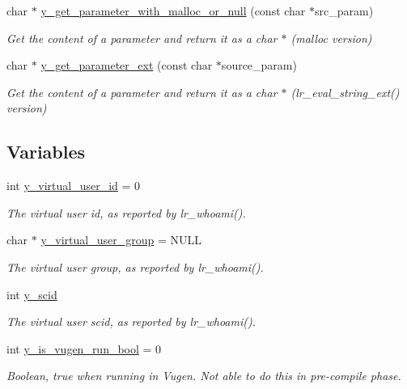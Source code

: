 \begin{DoxyCompactItemize}
char $\ast$ \hyperlink{group__core_gac0c6a383cf2934da4acc1451a1cdea21}{y\-\_\-get\-\_\-parameter\-\_\-with\-\_\-malloc\-\_\-or\-\_\-null} (const char $\ast$src\-\_\-param)
\begin{DoxyCompactList}\small\item\em Get the content of a parameter and return it as a char $\ast$ (malloc version) \end{DoxyCompactList}\item 
char $\ast$ \hyperlink{group__core_gaa80c4db4c75cdc0c03aad6f69b3dff3c}{y\-\_\-get\-\_\-parameter\-\_\-ext} (const char $\ast$source\-\_\-param)
\begin{DoxyCompactList}\small\item\em Get the content of a parameter and return it as a char $\ast$ (lr\-\_\-eval\-\_\-string\-\_\-ext() version) \end{DoxyCompactList}\end{DoxyCompactItemize}
\subsection*{Variables}
\begin{DoxyCompactItemize}
\item 
int \hyperlink{group__core_ga312065213820734af47b86c233a26c0d}{y\-\_\-virtual\-\_\-user\-\_\-id} = 0
\begin{DoxyCompactList}\small\item\em The virtual user id, as reported by lr\-\_\-whoami(). \end{DoxyCompactList}\item 
char $\ast$ \hyperlink{group__core_ga36fcd2d9a92671f11bfebf8b7bfa34ae}{y\-\_\-virtual\-\_\-user\-\_\-group} = N\-U\-L\-L
\begin{DoxyCompactList}\small\item\em The virtual user group, as reported by lr\-\_\-whoami(). \end{DoxyCompactList}\item 
int \hyperlink{group__core_ga1ebd23898db36692c02dd58d9649f4a1}{y\-\_\-scid}
\begin{DoxyCompactList}\small\item\em The virtual user scid, as reported by lr\-\_\-whoami(). \end{DoxyCompactList}\item 
int \hyperlink{group__core_ga6946e1e353167a7a711e3ddcb8a39b6d}{y\-\_\-is\-\_\-vugen\-\_\-run\-\_\-bool} = 0
\begin{DoxyCompactList}\small\item\em Boolean, true when running in Vugen. Not able to do this in pre-\/compile phase. \end{DoxyCompactList}\end{DoxyCompactItemize}


